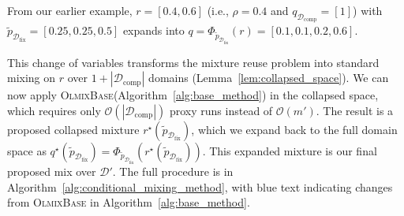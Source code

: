 \documentclass[table]{ai2style/ai2}
\newcommand{\D}[0]{\mathcal{D}}
\newcommand{\Dfix}[0]{\mathcal{D}_{\text{fix}}}
\newcommand{\Dcomp}[0]{\mathcal{D}_{\text{comp}}}
\newcommand{\base}[0]{\textsc{OlmixBase}\xspace}
\begin{document}
From our earlier example, $r = [0.4, 0.6]$ (i.e., $\rho = 0.4$ and $q_{\Dcomp} = [1]$) with $\tilde{p}_{\Dfix} = [0.25, 0.25, 0.5]$ expands into $q = \Phi_{\tilde{p}_{\Dfix}}(r) = [0.1, 0.1, 0.2, 0.6]$.

This change of variables transforms the mixture reuse problem into standard mixing on $r$ over $1 + |\Dcomp|$ domains (Lemma~\ref{lem:collapsed_space}). We can now apply \base (Algorithm~\ref{alg:base_method}) in the collapsed space, which requires only $\mathcal{O}(|\Dcomp|)$ proxy runs instead of $\mathcal{O}(m')$. 
The result is a proposed collapsed mixture $r^\star(\tilde{p}_{\Dfix})$, which we expand back to the full domain space as $q^\star(\tilde{p}_{\Dfix}) = \Phi_{\tilde{p}_{\Dfix}}(r^\star(\tilde{p}_{\Dfix}))$. This expanded mixture is our final proposed mix over $\D'$. The full procedure is in Algorithm~\ref{alg:conditional_mixing_method}, with \textcolor{olmoBlue}{blue} text indicating changes from \base in Algorithm~\ref{alg:base_method}.
\end{document}
